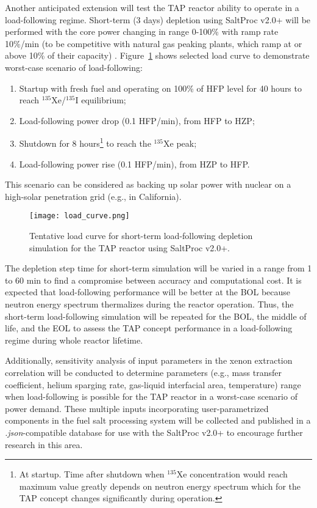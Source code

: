 Another anticipated extension will test the \gls{TAP} reactor ability to 
operate in a load-following regime. Short-term (3 days) depletion using 
SaltProc v2.0+ will be performed with the core power changing in range 0-100\% 
with ramp rate 10\%/min (to be competitive with natural gas peaking plants, 
which ramp at or above 10\% of their capacity) \cite{huff_enabling_2018}. 
Figure~\ref{fig:load} shows selected load curve to demonstrate worst-case 
scenario of load-following:
\begin{enumerate}
	\item Startup with fresh fuel and operating on 100\% of \gls{HFP}
level 
	for 40 hours to reach $^{135}$Xe/$^{135}$I equilibrium;
	\item Load-following power drop (0.1 \gls{HFP}/min), from \gls{HFP} 
	to \gls{HZP};
	\item Shutdown for 8 hours\footnote{At startup. Time after shutdown when 
	$^{135}$Xe concentration would reach maximum value greatly depends on 
	neutron energy spectrum which for the \gls{TAP} concept changes 
	significantly during operation.} to reach the $^{135}$Xe peak;
	\item Load-following power rise (0.1 \gls{HFP}/min), from \gls{HZP} 
	to \gls{HFP}.
\end{enumerate}
This scenario can be considered as backing up solar power with
nuclear on a 
high-solar penetration grid (e.g., in California).
\begin{figure}[bth!] %
	\centering
	\texttt{[image: load\_curve.png]}
	\caption{Tentative load curve for short-term load-following depletion 
	simulation for the \gls{TAP} reactor using SaltProc v2.0+.}
	\label{fig:load}
\end{figure}

The depletion step time for short-term simulation will be varied in a range 
from 1 to 60 min to find a compromise between accuracy and computational cost. 
It is expected that load-following performance will be better at the \gls{BOL} 
because neutron energy spectrum thermalizes during the reactor operation. 
Thus, the short-term load-following simulation will be repeated for the 
\gls{BOL}, the middle of life, and the \gls{EOL} to assess the \gls{TAP} 
concept performance in a load-following regime during whole reactor lifetime.

Additionally, sensitivity analysis of input parameters in the xenon extraction 
correlation will be conducted to determine parameters (e.g., mass transfer 
coefficient, helium sparging rate, gas-liquid interfacial area, temperature) 
range when load-following is possible for the \gls{TAP} 
reactor in a worst-case scenario of power demand. These multiple inputs 
incorporating user-parametrized components in the fuel salt processing 
system will be collected and published in a \textit{.json}-compatible database 
for use with the SaltProc v2.0+ to encourage further research in this area.


